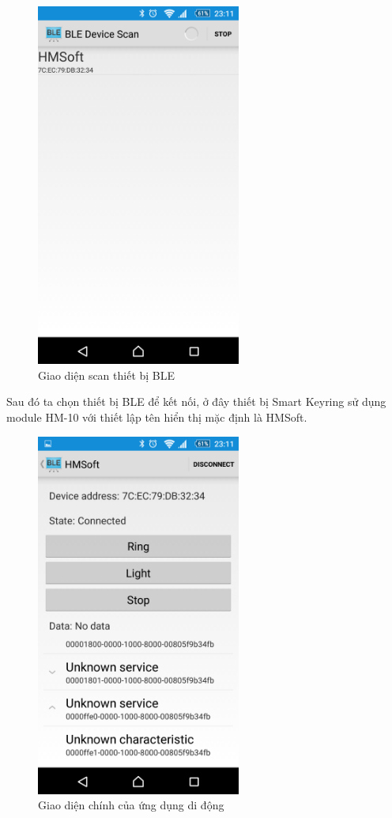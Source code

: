 	\begin{figure}[H]
		\centering    
		\includegraphics[width=0.6\textwidth]{android1}
		\caption[Giao diện scan thiết bị BLE]{Giao diện scan thiết bị BLE}
		\label{fig: android1}
	\end{figure}
Sau đó ta chọn thiết bị BLE để kết nối, ở đây thiết bị Smart Keyring sử dụng module HM-10 với thiết lập tên hiển thị mặc định là HMSoft. 
	\begin{figure}[H]
		\centering    
		\includegraphics[width=0.6\textwidth]{android2}
		\caption[Giao diện chính của ứng dụng di động]{Giao diện chính của ứng dụng di động}
		\label{fig: android2}
	\end{figure}
	

